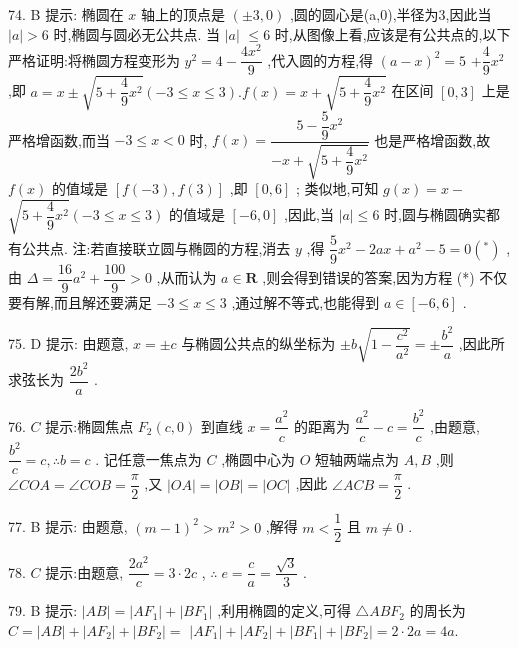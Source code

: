 74. B 提示: 椭圆在 $x$ 轴上的顶点是 $\left( {\pm 3,0}\right)$ ,圆的圆心是(a,0),半径为3,因此当 $\left| a\right|  > 6$ 时,椭圆与圆必无公共点. 当 $\left| a\right|$  $\leq  6$ 时,从图像上看,应该是有公共点的,以下严格证明:将椭圆方程变形为 ${y}^{2} = 4 - \dfrac{4{x}^{2}}{9}$ ,代入圆的方程,得 ${\left( a - x\right) }^{2} = 5$  $+ \dfrac{4}{9}{x}^{2}$ ,即 $a = x \pm  \sqrt{5 + \dfrac{4}{9}{x}^{2}}\left( {-3 \leq  x \leq  3}\right) .f\left( x\right)  = x + \sqrt{5 + \dfrac{4}{9}{x}^{2}}$ 在区间 $\left\lbrack  {0,3}\right\rbrack$ 上是严格增函数,而当 $- 3 \leq  x < 0$ 时, $f\left( x\right)  = \dfrac{5 - \dfrac{5}{9}{x}^{2}}{-x + \sqrt{5 + \dfrac{4}{9}{x}^{2}}}$ 也是严格增函数,故 $f\left( x\right)$ 的值域是 $\left\lbrack  {f\left( {-3}\right) ,f\left( 3\right) }\right\rbrack$ ,即 $\left\lbrack  {0,6}\right\rbrack$ ; 类似地,可知 $g\left( x\right)  = x -$  $\sqrt{5 + \dfrac{4}{9}{x}^{2}}\left( {-3 \leq  x \leq  3}\right)$ 的值域是 $\left\lbrack  {-6,0}\right\rbrack$ ,因此,当 $\left| a\right|  \leq  6$ 时,圆与椭圆确实都有公共点. 注:若直接联立圆与椭圆的方程,消去 $y$ ,得 $\dfrac{5}{9}{x}^{2} - {2ax} + {a}^{2} - 5 = 0\left( {}^{ * }\right)$ ,由 $\Delta  = \dfrac{16}{9}{a}^{2} + \dfrac{100}{9} > 0$ ,从而认为 $a \in  \mathbf{R}$ ,则会得到错误的答案,因为方程 (*) 不仅要有解,而且解还要满足 $- 3 \leq  x \leq  3$ ,通过解不等式,也能得到 $a \in  \left\lbrack  {-6,6}\right\rbrack$ .

75. D 提示: 由题意, $x =  \pm  c$ 与椭圆公共点的纵坐标为 $\pm  b\sqrt{1 - \dfrac{{c}^{2}}{{a}^{2}}} =  \pm  \dfrac{{b}^{2}}{a}$ ,因此所求弦长为 $\dfrac{2{b}^{2}}{a}$ .

76. $C$ 提示:椭圆焦点 ${F}_{2}\left( {c,0}\right)$ 到直线 $x = \dfrac{{a}^{2}}{c}$ 的距离为 $\dfrac{{a}^{2}}{c} - c = \dfrac{{b}^{2}}{c}$ ,由题意, $\dfrac{{b}^{2}}{c} = c,\therefore b = c$ . 记任意一焦点为 $C$ ,椭圆中心为 $O$ 短轴两端点为 $A,B$ ,则 $\angle {COA} = \angle {COB} = \dfrac{\pi }{2}$ ,又 $\left| {OA}\right|  = \left| {OB}\right|  = \left| {OC}\right|$ ,因此 $\angle {ACB} = \dfrac{\pi }{2}$ .

77. B 提示: 由题意, ${\left( m - 1\right) }^{2} > {m}^{2} > 0$ ,解得 $m < \dfrac{1}{2}$ 且 $m \neq  0$ .

78. $C$ 提示:由题意, $\dfrac{2{a}^{2}}{c} = 3 \cdot  {2c}$ , $\therefore \;e = \dfrac{c}{a} = \dfrac{\sqrt{3}}{3}$ .

79. B 提示: $\left| {AB}\right|  = \left| {A{F}_{1}}\right|  + \left| {B{F}_{1}}\right|$ ,利用椭圆的定义,可得 $\bigtriangleup {AB}{F}_{2}$ 的周长为 $C = \left| {AB}\right|  + \left| {A{F}_{2}}\right|  + \left| {B{F}_{2}}\right|  =$  $\left| {A{F}_{1}}\right|  + \left| {A{F}_{2}}\right|  + \left| {B{F}_{1}}\right|  + \left| {B{F}_{2}}\right|  = 2 \cdot  {2a} = {4a}.$

